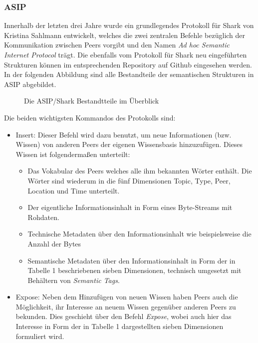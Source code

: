 \subsubsection{ASIP}
Innerhalb der letzten drei Jahre wurde ein grundlegendes Protokoll für Shark von Kristina Sahlmann entwickelt, welches die zwei zentralen Befehle bezüglich der Kommunikation zwischen Peers vorgibt und den Namen \textit{Ad hoc Semantic Internet Protocol} trägt. Die ebenfalls vom Protokoll für Shark neu eingeführten Strukturen können im entsprechenden Repository auf Github eingesehen werden. In der folgenden Abbildung sind alle Bestandteile der semantischen Strukturen in ASIP abgebildet.
\begin{figure}[H]
	\centering
	\hspace*{1cm}
	\caption{Die ASIP/Shark Bestandtteile im Überblick}
	\label{fig:knowledge}
\end{figure}
Die beiden wichtigsten Kommandos des Protokolls sind:
\begin{itemize}
	\item Insert: Dieser Befehl wird dazu benutzt, um neue Informationen (bzw. Wissen) von anderen Peers der eigenen Wissensbasis hinzuzufügen. Dieses Wissen ist folgendermaßen unterteilt:
	\begin{itemize}
		\item Das Vokabular des Peers welches alle ihm bekannten Wörter enthält. Die Wörter sind wiederum in die fünf Dimensionen Topic, Type, Peer, Location und Time unterteilt.
		\item Der eigentliche Informationsinhalt in Form eines Byte-Streams mit Rohdaten.
		\item Technische Metadaten über den Informationsinhalt wie beispielsweise die Anzahl der Bytes
		\item Semantische Metadaten über den Informationsinhalt in Form der in Tabelle 1 beschriebenen sieben Dimensionen, technisch umgesetzt mit Behältern von \textit{Semantic Tags}.		
	\end{itemize} 
	\item Expose: Neben dem Hinzufügen von neuen Wissen haben Peers auch die Möglichkeit, ihr Interesse an neuem Wissen gegenüber anderen Peers zu bekunden. Dies geschieht über den Befehl \textit{Expose}, wobei auch hier das Interesse in Form der in Tabelle 1 dargestellten sieben Dimensionen formuliert wird.
\end{itemize}
